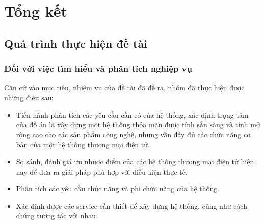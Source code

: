 \chapter{Tổng kết}
\section{Quá trình thực hiện đề tài}
\subsection{Đối với việc tìm hiểu và phân tích nghiệp vụ}
\noindent Căn cứ vào mục tiêu, nhiệm vụ của đề tài đã đề ra, nhóm đã thực hiện được những điều sau:
\begin{itemize}
    \item Tiến hành phân tích các yêu cầu cần có của hệ thống, xác định trọng tâm của đồ án là xây dựng một hệ thống thỏa mãn được tính sẵn sàng và tính mở rộng cao 
cho các sản phẩm công nghệ, nhưng vẫn đầy đủ các chức năng cơ bản của một hệ thống thương mại điện tử.
    \item So sánh, đánh giá ưu nhược điểm của  các hệ thống thương mại điện tử hiện nay để đưa ra giải pháp phù hợp với điều kiện thực tế.
    \item Phân tích các yêu cầu chức năng và phi chức năng của hệ thống.
    \item Xác định được các service cần thiết để xây dựng hệ thống, cũng như cách chúng tương tác với nhau.
\end{itemize}

